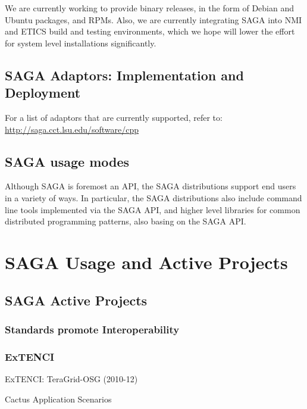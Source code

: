 \documentclass[12pt]{article}
\begin{document}
   We are currently working to provide binary releases, in the form of
   Debian and Ubuntu packages, and RPMs.  Also, we are currently
   integrating SAGA into NMI and ETICS build and testing environments,
   which we hope will lower the effort for system level installations
   significantly.

 \subsection{SAGA Adaptors: Implementation and Deployment}

  For a list of adaptors that are currently supported, refer to:
  \url{http://saga.cct.lsu.edu/software/cpp}


 \subsection{SAGA usage modes}

 Although SAGA is foremost an API, the SAGA distributions support end
 users in a variety of ways.  In particular, the SAGA distributions
 also include command line tools implemented via the SAGA API, and
 higher level libraries for common distributed programming patterns,
 also basing on the SAGA API.


\section{SAGA Usage and Active Projects}

\subsection{SAGA Active Projects}

 \subsubsection{Standards promote Interoperability}

 \subsubsection*{ExTENCI}

  ExTENCI: TeraGrid-OSG (2010-12)

  Cactus Application Scenarios
 
\end{document}

